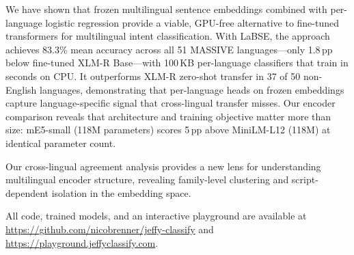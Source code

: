 \documentclass[11pt]{article}
\begin{document}
We have shown that frozen multilingual sentence embeddings combined with per-language logistic regression provide a viable, GPU-free alternative to fine-tuned transformers for multilingual intent classification. With LaBSE, the approach achieves 83.3\% mean accuracy across all 51 MASSIVE languages---only 1.8\,pp below fine-tuned XLM-R Base---with 100\,KB per-language classifiers that train in seconds on CPU. It outperforms XLM-R zero-shot transfer in 37 of 50 non-English languages, demonstrating that per-language heads on frozen embeddings capture language-specific signal that cross-lingual transfer misses. Our encoder comparison reveals that architecture and training objective matter more than size: mE5-small (118M parameters) scores 5\,pp above MiniLM-L12 (118M) at identical parameter count.

Our cross-lingual agreement analysis provides a new lens for understanding multilingual encoder structure, revealing family-level clustering and script-dependent isolation in the embedding space.

All code, trained models, and an interactive playground are available at \url{https://github.com/nicobrenner/jeffy-classify} and \url{https://playground.jeffyclassify.com}.




\end{document}
